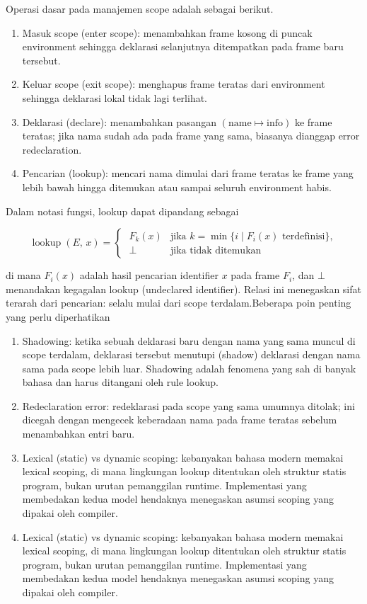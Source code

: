 Operasi dasar pada manajemen scope adalah sebagai berikut.
\begin{enumerate}
    \item Masuk scope (enter scope): menambahkan frame kosong di puncak environment sehingga deklarasi selanjutnya ditempatkan pada frame baru tersebut.
    \item Keluar scope (exit scope): menghapus frame teratas dari environment sehingga deklarasi lokal tidak lagi terlihat.
    \item Deklarasi (declare): menambahkan pasangan $(\mathrm{name}\mapsto\mathrm{info})$ ke frame teratas; jika nama sudah ada pada frame yang sama, biasanya dianggap error redeclaration.
    \item Pencarian (lookup): mencari nama dimulai dari frame teratas ke frame yang lebih bawah hingga ditemukan atau sampai seluruh environment habis.
\end{enumerate}

Dalam notasi fungsi, lookup dapat dipandang sebagai

$$
    \operatorname{lookup}(E,\,x)=
    \begin{cases}
        \;F_k(x) & \text{jika } k=\min\{i\mid F_i(x)\text{ terdefinisi}\}, \\
        \;\bot   & \text{jika tidak ditemukan}
    \end{cases}
$$

di mana $F_i(x)$ adalah hasil pencarian identifier $x$ pada frame $F_i$, dan $\bot$ menandakan kegagalan lookup (undeclared identifier). Relasi ini menegaskan sifat terarah dari pencarian: selalu mulai dari scope terdalam.Beberapa poin penting yang perlu diperhatikan

\begin{enumerate}
    \item Shadowing: ketika sebuah deklarasi baru dengan nama yang sama muncul di scope terdalam, deklarasi tersebut menutupi (shadow) deklarasi dengan nama sama pada scope lebih luar. Shadowing adalah fenomena yang sah di banyak bahasa dan harus ditangani oleh rule lookup.
    \item Redeclaration error: redeklarasi pada scope yang sama umumnya ditolak; ini dicegah dengan mengecek keberadaan nama pada frame teratas sebelum menambahkan entri baru.
    \item Lexical (static) vs dynamic scoping: kebanyakan bahasa modern memakai lexical scoping, di mana lingkungan lookup ditentukan oleh struktur statis program, bukan urutan pemanggilan runtime. Implementasi yang membedakan kedua model hendaknya menegaskan asumsi scoping yang dipakai oleh compiler.
    \item Lexical (static) vs dynamic scoping: kebanyakan bahasa modern memakai lexical scoping, di mana lingkungan lookup ditentukan oleh struktur statis program, bukan urutan pemanggilan runtime. Implementasi yang membedakan kedua model hendaknya menegaskan asumsi scoping yang dipakai oleh compiler.
\end{enumerate}

